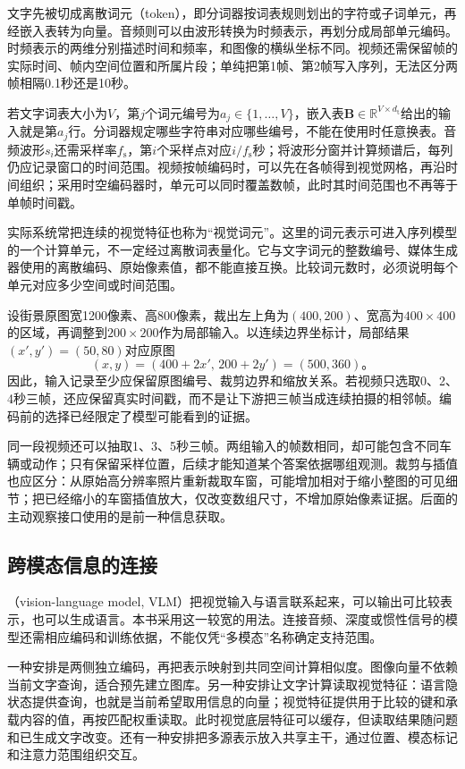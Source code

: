 文字先被切成离散词元（token），即分词器按词表规则划出的字符或子词单元，再经嵌入表转为向量。音频则可以由波形转换为时频表示，再划分成局部单元编码。时频表示的两维分别描述时间和频率，和图像的横纵坐标不同。视频还需保留帧的实际时间、帧内空间位置和所属片段；单纯把第1帧、第2帧写入序列，无法区分两帧相隔0.1秒还是10秒。

若文字词表大小为$V$，第$j$个词元编号为$a_j\in\{1,\ldots,V\}$，嵌入表$\bm B\in\mathbb R^{V\times d_{\mathrm t}}$给出的输入就是第$a_j$行。分词器规定哪些字符串对应哪些编号，不能在使用时任意换表。音频波形$s_i$还需采样率$f_{\mathrm s}$，第$i$个采样点对应$i/f_{\mathrm s}$秒；将波形分窗并计算频谱后，每列仍应记录窗口的时间范围。视频按帧编码时，可以先在各帧得到视觉网格，再沿时间组织；采用时空编码器时，单元可以同时覆盖数帧，此时其时间范围也不再等于单帧时间戳。

实际系统常把连续的视觉特征也称为“视觉词元”。这里的词元表示可进入序列模型的一个计算单元，不一定经过离散词表量化。它与文字词元的整数编号、媒体生成器使用的离散编码、原始像素值，都不能直接互换。比较词元数时，必须说明每个单元对应多少空间或时间范围。

设街景原图宽1200像素、高800像素，裁出左上角为$(400,200)$、宽高为$400\times400$的区域，再调整到$200\times200$作为局部输入。以连续边界坐标计，局部结果$(x',y')=(50,80)$对应原图
\[
  (x,y)=(400+2x',\,200+2y')=(500,360)\text{。}
\]
因此，输入记录至少应保留原图编号、裁剪边界和缩放关系。若视频只选取0、2、4秒三帧，还应保留真实时间戳，而不是让下游把三帧当成连续拍摄的相邻帧。编码前的选择已经限定了模型可能看到的证据。

同一段视频还可以抽取1、3、5秒三帧。两组输入的帧数相同，却可能包含不同车辆或动作；只有保留采样位置，后续才能知道某个答案依据哪组观测。裁剪与插值也应区分：从原始高分辨率照片重新裁取车窗，可能增加相对于缩小整图的可见细节；把已经缩小的车窗插值放大，仅改变数组尺寸，不增加原始像素证据。后面的主动观察接口使用的是前一种信息获取。

\subsection{跨模态信息的连接}
\label{sec:vision-models-connection}

（vision-language model, VLM）把视觉输入与语言联系起来，可以输出可比较表示，也可以生成语言。本书采用这一较宽的用法。连接音频、深度或惯性信号的模型还需相应编码和训练依据，不能仅凭“多模态”名称确定支持范围。

一种安排是两侧独立编码，再把表示映射到共同空间计算相似度。图像向量不依赖当前文字查询，适合预先建立图库。另一种安排让文字计算读取视觉特征：语言隐状态提供查询，也就是当前希望取用信息的向量；视觉特征提供用于比较的键和承载内容的值，再按匹配权重读取。此时视觉底层特征可以缓存，但读取结果随问题和已生成文字改变。还有一种安排把多源表示放入共享主干，通过位置、模态标记和注意力范围组织交互。

